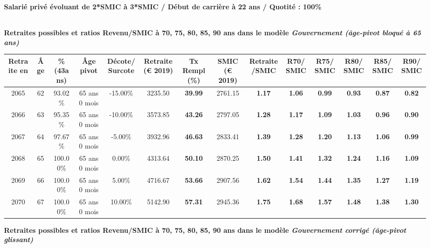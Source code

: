 {\bf \noindent Salarié privé évoluant de 2*SMIC à 3*SMIC / Début de carrière à 22 ans / Quotité : 100\%}  ~ 

 ~\\{\bf \noindent Retraites possibles et ratios Revenu/SMIC à 70, 75, 80, 85, 90 ans dans le modèle \emph{Gouvernement (âge-pivot bloqué à 65 ans)}}  
 
\begin{adjustbox}{max width=\textwidth} 
\begin{tabular}[htb]{|c|c||c|c|c||c|c||c|c||c|c|c|c|c|} 
\hline 
 Retraite en &  Âge &  \%(43ans) &  Âge pivot &  Décote/Surcote &  Retraite (\euro{} 2019) &  Tx Rempl(\%) &  SMIC (\euro{} 2019) &  Retraite/SMIC &  R70/SMIC &  R75/SMIC &  R80/SMIC &  R85/SMIC &  R90/SMIC \\ 
\hline \hline 
 2065 &  62 &  93.02\% &  65 ans 0 mois &  -15.00\% &  3235.50 &  {\bf 39.99} &  2761.15 &  {\bf 1.17} &  {\bf 1.06} &  {\bf {\color{red} 0.99}} &  {\bf {\color{red} 0.93}} &  {\bf {\color{red} 0.87}} &  {\bf {\color{red} 0.82}} \\ 
\hline 
 2066 &  63 &  95.35\% &  65 ans 0 mois &  -10.00\% &  3573.85 &  {\bf 43.26} &  2797.05 &  {\bf 1.28} &  {\bf 1.17} &  {\bf 1.09} &  {\bf 1.03} &  {\bf {\color{red} 0.96}} &  {\bf {\color{red} 0.90}} \\ 
\hline 
 2067 &  64 &  97.67\% &  65 ans 0 mois &  -5.00\% &  3932.96 &  {\bf 46.63} &  2833.41 &  {\bf 1.39} &  {\bf 1.28} &  {\bf 1.20} &  {\bf 1.13} &  {\bf 1.06} &  {\bf {\color{red} 0.99}} \\ 
\hline 
 2068 &  65 &  100.00\% &  65 ans 0 mois &  0.00\% &  4313.64 &  {\bf 50.10} &  2870.25 &  {\bf 1.50} &  {\bf 1.41} &  {\bf 1.32} &  {\bf 1.24} &  {\bf 1.16} &  {\bf 1.09} \\ 
\hline 
 2069 &  66 &  100.00\% &  65 ans 0 mois &  5.00\% &  4716.67 &  {\bf 53.66} &  2907.56 &  {\bf 1.62} &  {\bf 1.54} &  {\bf 1.44} &  {\bf 1.35} &  {\bf 1.27} &  {\bf 1.19} \\ 
\hline 
 2070 &  67 &  100.00\% &  65 ans 0 mois &  10.00\% &  5142.90 &  {\bf 57.31} &  2945.36 &  {\bf 1.75} &  {\bf 1.68} &  {\bf 1.57} &  {\bf 1.48} &  {\bf 1.38} &  {\bf 1.30} \\ 
\hline 
\hline 
\end{tabular} 
\end{adjustbox} 
 
 \vspace{0.1cm} 
{\bf \noindent Retraites possibles et ratios Revenu/SMIC à 70, 75, 80, 85, 90 ans dans le modèle \emph{Gouvernement corrigé (âge-pivot glissant)}}  
 
